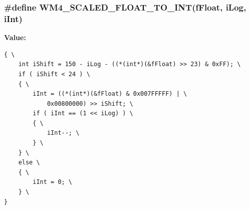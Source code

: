 \subsubsection{\setlength{\rightskip}{0pt plus 5cm}\#define WM4\_\-SCALED\_\-FLOAT\_\-TO\_\-INT(f\-Float, i\-Log, i\-Int)}\label{Wm4Math_8h_00ef31d3042640b57b3521e582dadf51}


\textbf{Value:}

\begin{Code}\begin{verbatim}{ \
    int iShift = 150 - iLog - ((*(int*)(&fFloat) >> 23) & 0xFF); \
    if ( iShift < 24 ) \
    { \
        iInt = ((*(int*)(&fFloat) & 0x007FFFFF) | \
            0x00800000) >> iShift; \
        if ( iInt == (1 << iLog) ) \
        { \
            iInt--; \
        } \
    } \
    else \
    { \
        iInt = 0; \
    } \
}
\end{verbatim}\end{Code}
